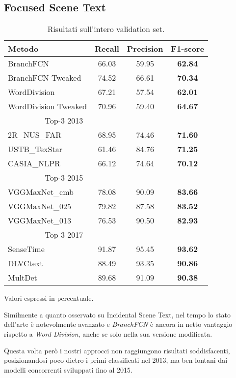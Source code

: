 \subsection{Focused Scene Text}

\begin{table}[H]
\centering
\begin{threeparttable}
	\begin{tabular}{l *{2}c >{\bf}c }
		\toprule
		
		\textbf{Metodo} & \textbf{Recall} & \textbf{Precision} & \textbf{F1-score} \\

		\midrule

		BranchFCN
		& 66.03 & 59.95 & 62.84 \\	
		BranchFCN Tweaked
		& 74.52 & 66.61 & 70.34 \\
		WordDivision
		& 67.21 & 57.54 & 62.01 \\
		WordDivision Tweaked
		& 70.96 & 59.40 & 64.67 \\
		\midrule

		\multicolumn{1}{r}{Top-3 2013~\cite{ICDAR2013results}} \\
		2R\_NUS\_FAR
		& 68.95 & 74.46 & 71.60 \\
		USTB\_TexStar
		& 61.46 & 84.76 & 71.25 \\
		CASIA\_NLPR
		& 66.12 & 74.64 & 70.12 \\
		\midrule

		\multicolumn{1}{r}{Top-3 2015~\cite{ICDAR2013results}} \\
		VGGMaxNet\_cmb~\cite{vggmaxnet}
		& 78.08 & 90.09 & 83.66 \\
		VGGMaxNet\_025~\cite{vggmaxnet}
		& 79.82 & 87.58 & 83.52 \\
		VGGMaxNet\_013~\cite{vggmaxnet}
		& 76.53 & 90.50 & 82.93 \\
		\midrule

		\multicolumn{1}{r}{Top-3 2017~\cite{ICDAR2013results}} \\	
		SenseTime
		& 91.87 & 95.45 & 93.62 \\
		DLVCtext
		& 88.49 & 93.35 & 90.86 \\
		MultDet
		& 89.68 & 91.09 & 90.38 \\

		\bottomrule
	\end{tabular}
	\begin{tablenotes}
		\item \footnotesize{Valori espressi in percentuale.}
	\end{tablenotes}
\end{threeparttable}
\caption{Risultati sull'intero validation set.}\label{tab:focused_results}
\end{table}

Similmente a quanto osservato su Incidental Scene Text, nel tempo lo stato dell'arte è notevolmente avanzato e \textit{BranchFCN} è ancora in netto vantaggio rispetto a \textit{Word Division}, anche se solo nella sua versione modificata.\par
Questa volta però i nostri approcci non raggiungono risultati soddisfacenti, posizionandosi poco dietro i primi classificati nel 2013, ma ben lontani dai modelli concorrenti sviluppati fino al 2015.

